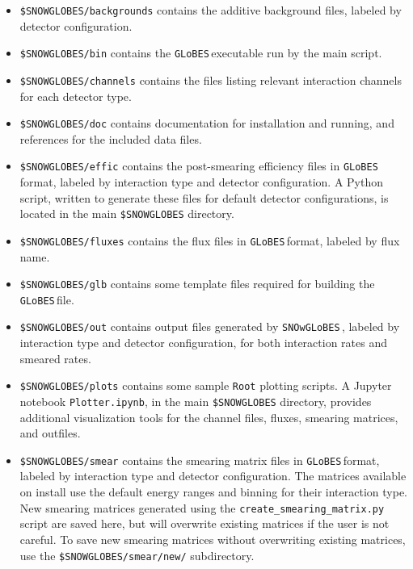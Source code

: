 \documentclass{article}
\newcommand{\snow}{\texttt{SNOwGLoBES}\,}
\newcommand{\glb}{\texttt{GLoBES}\,}
\begin{document}
\begin{itemize}

\item \texttt{\$SNOWGLOBES/backgrounds} contains the additive background files, labeled by detector configuration.

\item \texttt{\$SNOWGLOBES/bin} contains the \glb executable run by the main script.

\item \texttt{\$SNOWGLOBES/channels} contains the files listing relevant interaction channels for each detector type.

\item \texttt{\$SNOWGLOBES/doc} contains documentation for installation and running, and references for the included data files. 

\item \texttt{\$SNOWGLOBES/effic} contains the post-smearing efficiency files in \glb format, labeled by interaction type and detector configuration. A Python script, written to generate these files for default detector configurations, is located in the main \texttt{\$SNOWGLOBES} directory.

\item \texttt{\$SNOWGLOBES/fluxes} contains the flux files in \glb format, labeled by flux name.

\item \texttt{\$SNOWGLOBES/glb} contains some template files required for building the \glb file.

\item \texttt{\$SNOWGLOBES/out} contains output files generated by \snow, labeled by interaction type and detector configuration, for both interaction rates and smeared rates.

\item \texttt{\$SNOWGLOBES/plots} contains some sample \texttt{Root} plotting scripts. A Jupyter notebook \texttt{Plotter.ipynb}, in the main \texttt{\$SNOWGLOBES} directory, provides additional visualization tools for the channel files, fluxes, smearing matrices, and outfiles.

\item \texttt{\$SNOWGLOBES/smear} contains the smearing matrix files in \glb format, labeled by interaction type and detector configuration. The matrices available on install use the default energy ranges and binning for their interaction type. New smearing matrices generated using the \texttt{create\_smearing\_matrix.py} script are saved here, but will overwrite existing matrices if the user is not careful. To save new smearing matrices without overwriting existing matrices, use the \texttt{\$SNOWGLOBES/smear/new/} subdirectory.


\end{itemize}
\end{document}
